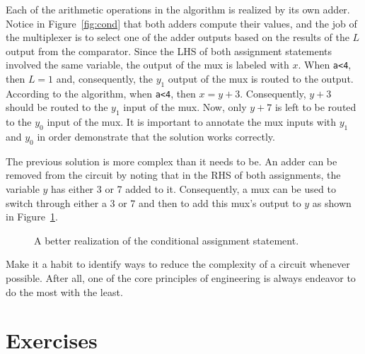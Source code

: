 Each of the arithmetic operations in the algorithm is realized 
by its own adder. Notice in Figure~\ref{fig:cond} that both 
adders compute their values, and the job of the multiplexer is to 
select one of the adder outputs based on the results of the $L$ output 
from the comparator.    Since the LHS of both assignment statements
involved the same variable, the output of the mux is labeled with
$x$.  When \verb+a<4+, then 
$L=1$ and, consequently, the $y_1$ output of the mux is routed to the
output.  According to the algorithm, when \verb+a<4+, then $x=y+3$.
Consequently, $y+3$ should be routed to the $y_1$ input of the mux.
Now, only $y+7$ is left to be routed to the $y_0$ input of the mux.  It is
important to annotate the mux inputs with $y_1$ and $y_0$ in order
demonstrate that the solution works correctly.

The previous solution is more complex than it needs to be. An adder
can be removed from the circuit by noting that in the RHS of both 
assignments, the variable $y$ has either 3 or 7 added to it.  
Consequently, a mux can be used to switch through either a 3 or
7 and then to add this mux's output to $y$ as shown in 
Figure~\ref{fig:cond2}.

\begin{figure}[ht]
\caption{A better realization of the conditional assignment statement.}
\label{fig:cond2}
\end{figure}

Make it a habit to identify ways to reduce the complexity
of a circuit whenever possible.  After all, one of the core
principles of engineering is always endeavor to do the most with 
the least.

\section{Exercises}

